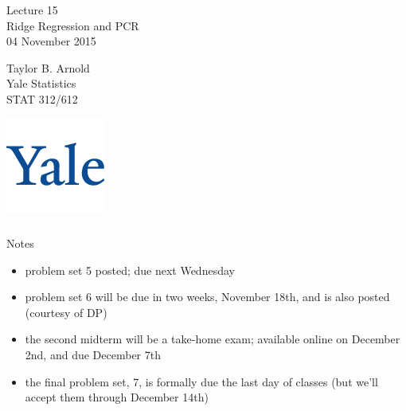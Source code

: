 



\begin{frame}[fragile] \frametitle{}

\vfill

{\fontsize{0.7cm}{0cm}\selectfont Lecture 15 \\\vspace{0.2cm}
Ridge Regression and PCR}\\\vspace{0.5cm}
04 November 2015

\vspace{2cm}

\begin{minipage}{0.6\textwidth}
Taylor B. Arnold \\
Yale Statistics \\
STAT 312/612
\end{minipage}
\hfill
\begin{minipage}{0.3\textwidth}\raggedleft
\includegraphics[scale=0.3]{../yale-logo.png}
\end{minipage}%

\end{frame}

\begin{frame}[fragile] \frametitle{}

{\color{yaleblue}\fontsize{16pt}{20pt}\selectfont Notes}

\begin{itemize}
\item problem set 5 posted; due next Wednesday \pause
\item problem set 6 will be due in two weeks, November 18th,
  and is also posted (courtesy of DP) \pause
\item the second midterm will be a take-home exam; available online on
  December 2nd, and due December 7th \pause
\item the final problem set, 7, is formally due the last day of
  classes (but we'll accept them through December 14th)
\end{itemize}

\end{frame}

